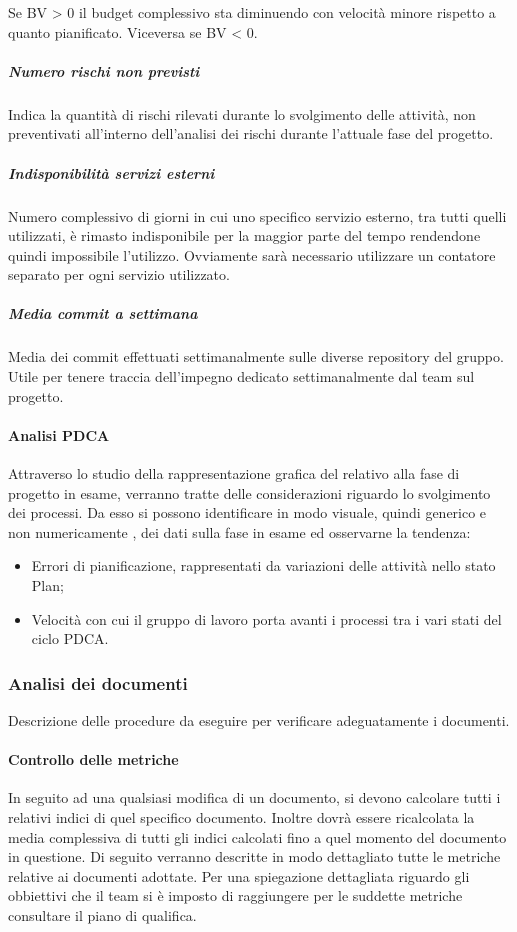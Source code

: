 Se BV > 0 il budget complessivo sta diminuendo con velocità minore rispetto a quanto pianificato. Viceversa se BV < 0.
\subparagraph{Numero rischi non previsti}\Spazio
Indica la quantità di rischi rilevati durante lo svolgimento delle attività, non preventivati all'interno dell'analisi dei rischi durante l'attuale fase del progetto.
\subparagraph{Indisponibilità servizi esterni}\Spazio
Numero complessivo di giorni in cui uno specifico servizio esterno, tra tutti quelli utilizzati, è rimasto indisponibile per la maggior parte del tempo rendendone quindi impossibile l'utilizzo. Ovviamente sarà necessario utilizzare un contatore separato per ogni servizio utilizzato.
\subparagraph{Media commit a settimana}\Spazio
Media dei commit effettuati settimanalmente sulle diverse repository del gruppo. Utile per tenere traccia dell'impegno dedicato settimanalmente dal team sul progetto.

\paragraph{Analisi PDCA} \Spazio
Attraverso lo studio della rappresentazione grafica del  relativo alla fase di progetto in esame, verranno tratte delle considerazioni riguardo lo svolgimento dei processi.
Da esso si possono identificare in modo visuale, quindi generico e non numericamente , dei dati sulla fase in esame ed osservarne la tendenza:
\begin{itemize}
	\item Errori di pianificazione, rappresentati da variazioni delle attività nello stato
	Plan;
	\item Velocità con cui il gruppo di lavoro porta avanti i processi tra i vari stati del
	ciclo PDCA.
\end{itemize}



\subsubsection{Analisi dei documenti}
 Descrizione delle procedure da eseguire per verificare adeguatamente i documenti.
\paragraph{Controllo delle metriche} \Spazio
In seguito ad una qualsiasi modifica di un documento, si devono calcolare tutti i relativi indici di quel specifico documento. Inoltre dovrà essere ricalcolata la media complessiva di tutti gli indici calcolati fino a quel momento del documento in questione.
Di seguito verranno descritte in modo dettagliato tutte le metriche relative ai documenti adottate. Per una spiegazione dettagliata riguardo gli obbiettivi che il team si è imposto di raggiungere per le suddette metriche consultare il piano di qualifica.

